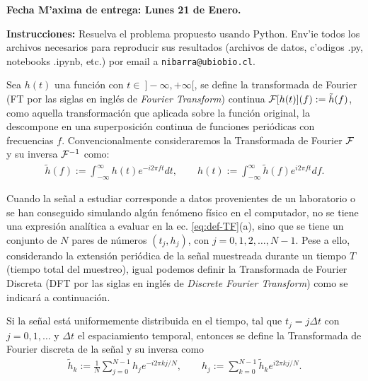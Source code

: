 \documentclass[11pt]{exam}
\begin{document}
\firstpageheadrule
\runningheadrule
{}
\cfoot{ }
\begin{flushleft}
\vspace{0.2in}
\vspace{0.25cm}
\end{flushleft}

\begin{center}
\textbf{Fecha M'axima de entrega: Lunes 21 de Enero.}
\end{center}
\textbf{Instrucciones:} Resuelva el problema propuesto usando Python. Env'ie todos los archivos necesarios para reproducir sus resultados (archivos de datos, c'odigos .py, notebooks .ipynb, etc.) por email a \texttt{nibarra@ubiobio.cl}.

\bigskip
Sea $h(t)$ una funci\'on con $t \in \ ]-\infty,+\infty[$, se define la transformada de Fourier (FT por las siglas en ingl\'es de \textit{Fourier Transform}) continua ${\cal F} [h(t)](f):=\tilde{h}(f)$, como aquella transformaci\'on que aplicada sobre la funci\'on original, la descompone en una superposici\'on continua de funciones peri\'odicas con frecuencias $f$. Convencionalmente consideraremos la Transformada de Fourier ${\cal F}$ y su inversa ${\cal F}^{-1}$ como:
\begin{align}
\tilde{h}(f):=\int_{-\infty}^{\infty}h(t)e^{-i2\pi ft}dt, \qquad
h(t):=\int_{-\infty}^{\infty}\tilde{h}(f)e^{i2\pi ft}df.\label{eq:def-TF}
\end{align}

Cuando la se\~nal a estudiar corresponde a datos provenientes de un laboratorio o se han conseguido simulando alg\'un fen\'omeno f\'isico en el computador, no se tiene una expresi\'on anal\'itica a evaluar en la ec. \eqref{eq:def-TF}(a), sino que se tiene un conjunto de $N$ pares de n\'umeros $(t_{j}, h_{j})$, con $j=0,1,2,\dotsc,N-1$. Pese a ello, considerando la extensi\'on peri\'odica de la se\~nal muestreada durante un tiempo $T$ (tiempo total del muestreo), igual podemos definir la Transformada de Fourier Discreta (DFT por las siglas en ingl\'es de \textit{Discrete Fourier Transform}) como se indicar\'a a continuaci\'on.

Si la se\~nal est\'a uniformemente distribuida en el tiempo, tal que $t_j=j\Delta t$ con $j=0,1,\dotsc$ y $\Delta t$ el espaciamiento temporal, entonces se define la Transformada de Fourier discreta de la se\~nal y su inversa como 
\begin{align}\label{eq:def-UDFT}
\tilde{h}_k:=\frac{1}{N}\sum_{j=0}^{N-1}h_{j}e^{- i 2\pi k j/N},\qquad
h_j:= \sum_{k=0}^{N-1}\tilde{h}_{k}e^{i 2\pi k j/N}.
\end{align}
\end{document}
